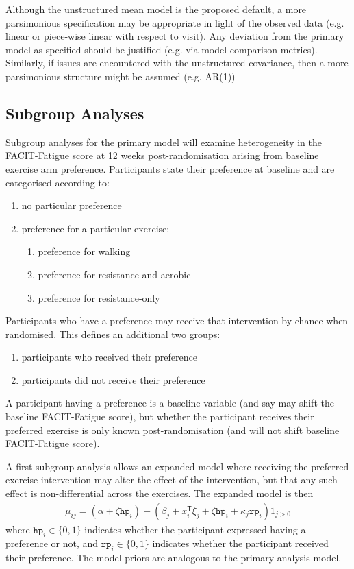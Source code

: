 \documentclass[11pt,parskip=half-]{scrartcl}
\providecommand{\tightlist}{%
  \setlength{\itemsep}{0pt}\setlength{\parskip}{0pt}}
\begin{document}
Although the unstructured mean model is the proposed default, a more parsimonious specification may be appropriate in light of the observed data (e.g. linear or piece-wise linear with respect to visit). Any deviation from the primary model as specified should be justified (e.g. via model comparison metrics). Similarly, if issues are encountered with the unstructured covariance, then a more parsimonious structure might be assumed (e.g. AR(1))

\subsection{Subgroup Analyses}\label{subgroup-analyses}

Subgroup analyses for the primary model will examine heterogeneity in the FACIT-Fatigue score at 12 weeks post-randomisation arising from baseline exercise arm preference. Participants state their preference at baseline and are categorised according to:

\begin{enumerate}\tightlist
  \item no particular preference
  \item preference for a particular exercise:
        \begin{enumerate}\tightlist
          \item preference for walking
          \item preference for resistance and aerobic
          \item preference for resistance-only
        \end{enumerate}
\end{enumerate}

Participants who have a preference may receive that intervention by chance when randomised. This defines an additional two groups:
\begin{enumerate}\tightlist
  \item participants who received their preference
  \item participants did not receive their preference
\end{enumerate}

A participant having a preference is a baseline variable (and say may shift the baseline FACIT-Fatigue score), but whether the participant receives their preferred exercise is only known post-randomisation (and will not shift baseline FACIT-Fatigue score).

A first subgroup analysis allows an expanded model where receiving the preferred exercise intervention may alter the effect of the intervention, but that any such effect is non-differential across the exercises.
The expanded model is then
$$
  \begin{aligned}
    \mu_{ij} = (\alpha + \zeta\texttt{hp}_i) + (\beta_j + x_i^{\mathsf{T}}\xi_{j} + \zeta\texttt{hp}_i + \kappa_j\texttt{rp}_i)1_{j>0}
  \end{aligned}
$$
where $\texttt{hp}_i\in\{0,1\}$ indicates whether the participant expressed having a preference or not, and $\texttt{rp}_i\in\{0,1\}$ indicates whether the participant received their preference. The model priors are analogous to the primary analysis model.
\end{document}
